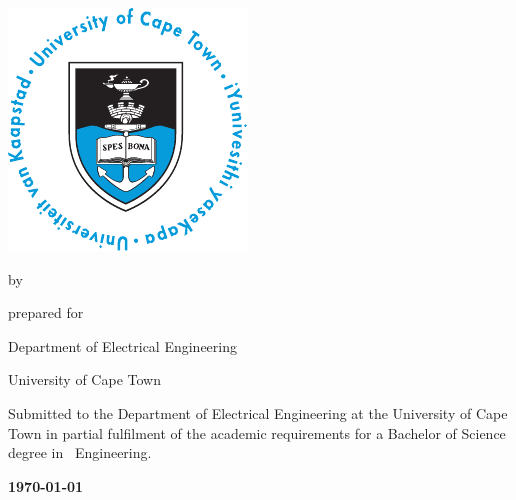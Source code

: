 \begin{titlepage}
  \null
  \vfill
  {\centering\Huge\bfseries\thetitle\par}
  \vfill
  \vskip 5mm
  {\centering\includegraphics[scale=1.1]{figures/uctlogo}\par}
  \vfill
  \begin{center}by \textsc{\theauthor}\end{center}
  \vfill
  {\centering prepared for \textsc{\thesupervisor}\par Department of Electrical Engineering\par University of Cape Town\par}
  \vfill
  \noindent
  Submitted to the Department of Electrical Engineering at the University of Cape Town in partial fulfilment of the academic requirements for a Bachelor of Science degree in \thestream~Engineering.
  \vfill
  \begin{center}\bfseries\today\end{center}
  \vfill
\end{titlepage}

